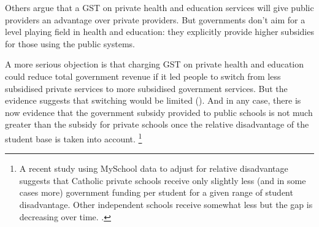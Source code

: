 \documentclass{grattanAlpha}
\begin{document}
Others argue that a GST on private health and education services will give public providers an advantage over private providers. But governments don’t aim for a level playing field in health and education: they explicitly provide higher subsidies for those using the public systems. 

A more serious objection is that charging GST on private health and education could reduce total government revenue if it led people to switch from less subsidised private services to more subsidised government services. But the evidence suggests that switching would be limited (). And in any case, there is now evidence that the government subsidy provided to public schools is not much greater than the subsidy for private schools once the relative disadvantage of the student base is taken into account.%
\footnote{A recent study using MySchool data to adjust for relative disadvantage suggests that Catholic private schools receive only slightly less (and in some cases more) government funding per student for a given range of student disadvantage. Other independent schools receive somewhat less but the gap is decreasing over time. \textcite{BonnerSheperd2015}.}
\end{document}
